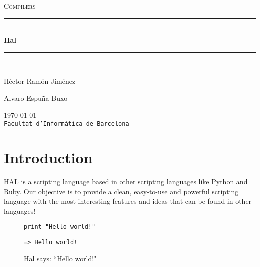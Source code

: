 \documentclass[a4paper,11pt]{article}
\begin{document}
\begin{titlepage}
\begin{center}
\textsc{\Large Compilers}
\\[1.5cm]
\rule{\linewidth}{0.5mm}
\\[0.4cm]
{\huge
\bfseries
Hal
\\[0.4cm]
}
\rule{\linewidth}{0.5mm}
\\[2.5cm]
\begin{minipage}{0.4\textwidth}
\begin{flushleft}
\large
Héctor Ramón Jiménez
\end{flushleft}
\end{minipage}
\begin{minipage}{0.4\textwidth}
\begin{flushright}
\large
Alvaro Espuña Buxo
\end{flushright}
\end{minipage}
\vfill
{\large
\today
}
\\
{\large
\texttt{Facultat d'Informàtica de Barcelona}
}
\end{center}
\end{titlepage}
\section{Introduction}
HAL is a scripting language based in other scripting languages like Python and Ruby.
    Our objective is to provide a clean, easy-to-use and powerful scripting language with the
    most interesting features and ideas that can be found in other languages!
\begin{figure}[h!]
\begin{lstlisting}[language=hal]
print "Hello world!"
\end{lstlisting}
\begin{verbatim}
=> Hello world!
\end{verbatim}
\caption{Hal says: ``Hello world!"}
\end{figure}
\end{document}
